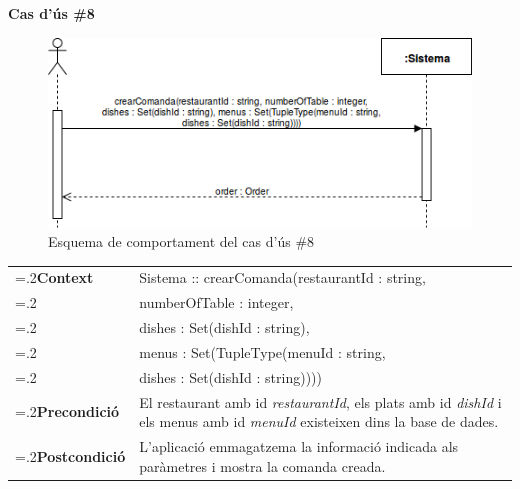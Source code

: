 \noindent\textbf{\large Cas d'ús \#8}\\
\begin{figure}[H]
\centering
\includegraphics[scale=0.6]{Figures/casdus_08.png}
\caption{Esquema de comportament del cas d'ús \#8}
\end{figure}
\begin{table}[h]
\noindent
\begin{tabularx}{\linewidth}{
>{\hsize=.2\hsize}X%
>{\hsize=0.8\hsize}X%
}
\textbf{Context} 		& Sistema :: crearComanda(restaurantId : string, \\
						& numberOfTable : integer, \\
						& dishes : Set(dishId : string), \\
						& menus : Set(TupleType(menuId : string, \\
						& dishes : Set(dishId : string)))) \\
\textbf{Precondició} 	& El restaurant amb id \textit{restaurantId}, els plats amb id \textit{dishId} i els menus amb id \textit{menuId} existeixen dins la base de dades. \\
\textbf{Postcondició}	& L'aplicació emmagatzema la informació indicada als paràmetres i mostra la comanda creada. \\
\end{tabularx}
\label{}
\end{table}

